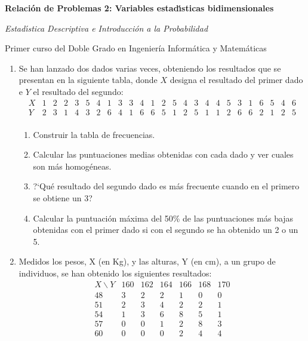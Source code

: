 \documentclass[11pt]{book}
\begin{document}
\centerline{\large \bf Relaci{\'o}n de Problemas 2: Variables estad{\'\i}sticas bidimensionales}
\smallskip \centerline{\large \it Estad{\'\i}stica Descriptiva e Introducci{\'o}n a la
Probabilidad}

\centerline{Primer curso del Doble Grado en Ingenier\'ia Inform\'atica y Matem{\'a}ticas}
\hrulefill \vskip 0.5cm

\begin{enumerate}
\item Se han lanzado dos dados varias veces, obteniendo los resultados que se presentan en la siguiente tabla, donde $X$ designa el resultado del primer dado  e $Y$ el resultado del segundo:
$$
   \begin{array}{|c|c|c|c|c|c|c|c|c|c|c|c|c|c|c|c|c|c|c|c|c|c|c|c|c|}
 X & 1 & 2 & 2 & 3 & 5 & 4 & 1 & 3 & 3 & 4 & 1 & 2 & 5 & 4 & 3 & 4 & 4 & 5 & 3 & 1 & 6 & 5 & 4 & 6 \\ \hline
 Y & 2 & 3 & 1 & 4 & 3 & 2 & 6 & 4 & 1 & 6 & 6 & 5 & 1 & 2 & 5 & 1 & 1 & 2 & 6 & 6 & 2 & 1 & 2 & 5 \\
   \end{array}
$$

  \begin{enumerate}
     \item Construir la tabla de frecuencias.
     \item Calcular las puntuaciones medias obtenidas con cada dado y ver cuales son m\'as homog\'eneas.
     \item ?`Qu\'e
      resultado del segundo dado es  m\'as frecuente cuando en el primero se obtiene
        un 3?
     \item Calcular la puntuaci\'on m\'axima del 50\% de las puntuaciones m\'as bajas obtenidas con el primer dado si con el segundo se ha obtenido un 2 o un 5.
   \end{enumerate}

 \item Medidos los pesos, X (en Kg), y las alturas, Y (en cm),  a un grupo de individuos, se han obtenido los siguientes resultados:
$$
   \begin{array}{c|cccccc}
     X \backslash Y &  160 & 162 & 164 & 166 & 168 & 170  \\ \hline
       48  &   3  &  2  &  2  &  1  &  0  &  0   \\
       51  &   2  &  3  &  4  &  2  &  2  &  1  \\
       54  &   1  &  3  &  6  &  8  &  5  &  1   \\
       57  &   0  &  0  &  1  &  2  &  8  &  3   \\
       60  &   0  &  0  &  0  &  2  &  4  &  4   \\
    \end{array}
$$


\end{enumerate}
\end{document}
